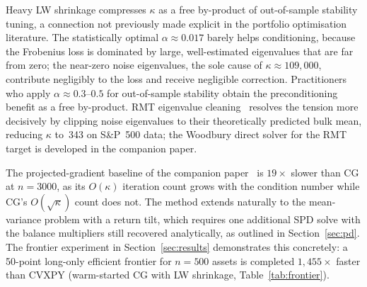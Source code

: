 Heavy LW shrinkage compresses $\kappa$ as a free by-product of out-of-sample stability
tuning, a connection not previously made explicit in the portfolio optimisation literature.
The statistically optimal $\alpha \approx 0.017$ barely helps conditioning, because the
Frobenius loss is dominated by large, well-estimated eigenvalues that are far from zero;
the near-zero noise eigenvalues, the sole cause of $\kappa \approx 109{,}000$, contribute
negligibly to the loss and receive negligible correction. Practitioners who apply
$\alpha \approx 0.3$--$0.5$ for out-of-sample stability obtain the preconditioning benefit
as a free by-product. RMT eigenvalue cleaning~\cite{schmelzer2026rmt} resolves the
tension more decisively by clipping noise eigenvalues to their theoretically predicted
bulk mean, reducing $\kappa$ to~343 on S\&P~500 data; the Woodbury direct solver for the
RMT target is developed in the companion paper.

The projected-gradient baseline of the companion paper~\cite{schmelzer2026nncg} is
$19\times$ slower than CG at $n=3000$,
as its $O(\kappa)$ iteration count grows with the condition number while CG's $O(\sqrt\kappa)$
count does not. The method extends naturally to the
mean-variance problem with a return tilt, which requires one additional SPD solve with
the balance multipliers still recovered analytically, as outlined in Section~\ref{sec:pd}.
The frontier experiment in Section~\ref{sec:results} demonstrates this concretely:
a 50-point long-only efficient frontier for $n=500$ assets is completed
$1{,}455\times$ faster than CVXPY (warm-started CG with LW shrinkage, Table~\ref{tab:frontier}).
